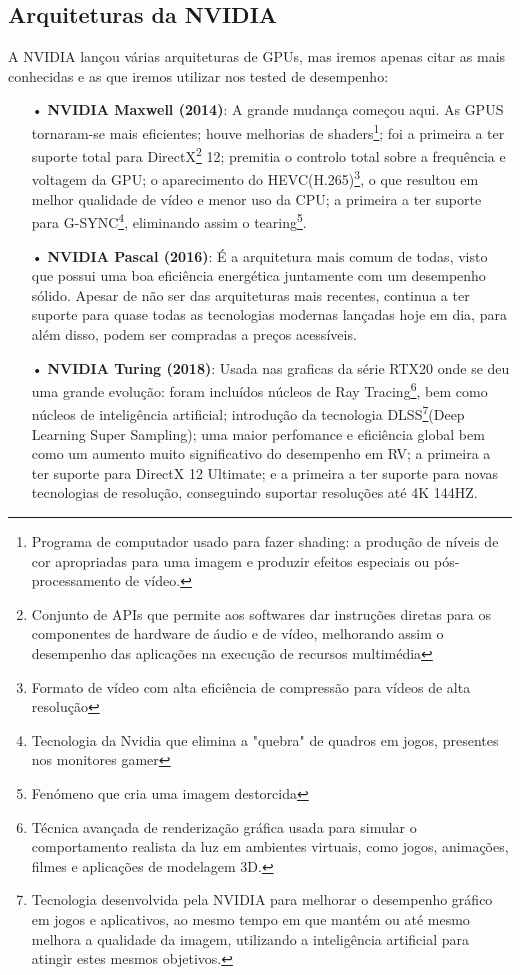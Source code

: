 \documentclass[a4paper,11pt,]{report}
\begin{document}
\subsection{Arquiteturas da NVIDIA}
A NVIDIA lançou várias arquiteturas de GPUs, mas iremos apenas citar as mais conhecidas e as que iremos utilizar nos tested de desempenho:
\begin{itemize}
 \item[•] \textbf{NVIDIA Maxwell (2014)}: A grande mudança começou aqui. As GPUS tornaram-se mais eficientes; houve melhorias de shaders\footnote{Programa de computador usado para fazer shading: a produção de níveis de cor apropriadas para uma imagem e produzir efeitos especiais ou pós-processamento de vídeo.}; foi a primeira a ter suporte total para DirectX\footnote{Conjunto de APIs que permite aos softwares dar instruções diretas para os componentes de hardware de áudio e de vídeo, melhorando assim o desempenho das aplicações na execução de recursos multimédia} 12; premitia o controlo total sobre a frequência e voltagem da GPU; o aparecimento do HEVC(H.265)\footnote{Formato de vídeo com alta eficiência de compressão para vídeos de alta resolução}, o que resultou em melhor qualidade de vídeo e menor uso da CPU; a primeira a ter suporte para G-SYNC\footnote{Tecnologia da Nvidia que elimina a "quebra" de quadros em jogos, presentes nos monitores gamer}, eliminando assim o tearing\footnote{Fenómeno que cria uma imagem destorcida}.
 \item[•] \textbf{NVIDIA Pascal (2016)}: É a arquitetura mais comum de todas, visto que possui uma boa eficiência energética juntamente com um desempenho sólido. Apesar de não ser das  arquiteturas mais recentes, continua a ter suporte para quase todas as tecnologias modernas lançadas hoje em dia, para além disso, podem ser compradas a preços acessíveis.
 \item[•] \textbf{NVIDIA Turing (2018)}: Usada nas graficas da série RTX20 onde se deu uma grande evolução: foram incluídos núcleos de Ray Tracing\footnote{Técnica avançada de renderização gráfica usada para simular o comportamento realista da luz em ambientes virtuais, como jogos, animações, filmes e aplicações de modelagem 3D.}, bem como núcleos de inteligência artificial; introdução da tecnologia DLSS\footnote{Tecnologia desenvolvida pela NVIDIA para melhorar o desempenho gráfico em jogos e aplicativos, ao mesmo tempo em que mantém ou até mesmo melhora a qualidade da imagem, utilizando a inteligência artificial para atingir estes mesmos objetivos.}(Deep Learning Super Sampling); uma maior perfomance e eficiência global bem como um aumento muito significativo do desempenho em RV; a primeira a ter suporte para DirectX 12 Ultimate; e a primeira a ter suporte para novas tecnologias de resolução, conseguindo suportar resoluções até 4K 144HZ.

\end{itemize}
\end{document}
